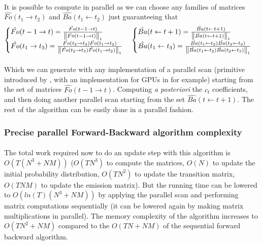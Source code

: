 \paragraph{}
It is possible to compute in parallel as we can choose any families of matrices $\hat{Fo}(t_1 \rightarrow t_2)$ and $\hat{Ba}(t_1 \leftarrow t_2)$ just guaranteeing that
\begin{equation}
\begin{cases}
\hat{Fo}( t - 1 \rightarrow t) = \frac{\bar{Fo}( t - 1 \rightarrow t)}{\left\lVert\bar{Fo}( t - 1 \rightarrow t)\right\rVert_1} & \\
\hat{Fo}( t_1 \rightarrow t_3) =   \frac{\hat{Fo}( t_2 \rightarrow t_3) \hat{Fo}( t_1 \rightarrow t_2)}{\left\lVert\hat{Fo}( t_2 \rightarrow t_3) \hat{Fo}( t_1 \rightarrow t_2)\right\rVert_1}& \\
\end{cases}
\begin{cases}
\hat{Ba}(t \leftarrow t+1) = \frac{\bar{Ba}(t \leftarrow t+1)}{\left\lVert\bar{Ba}(t \leftarrow t+1)\right\rVert_1} & \\
\hat{Ba}(t_1 \leftarrow t_3) = \frac{\hat{Ba}(t_1 \leftarrow t_2) \hat{Ba}(t_2 \leftarrow t_3)}{\left\lVert\hat{Ba}(t_1 \leftarrow t_2) \hat{Ba}(t_2 \leftarrow t_3)\right\rVert_1} & \\
\end{cases}
\end{equation}

\paragraph{}
Which we can generate with any implementation of a parallel scan (primitive introduced by \cite{blelloch1990prefix}, with an implementation for GPUs in \cite{sengupta2008efficient} for example) starting from the set of matrices $\hat{Fo}( t - 1 \rightarrow t)$. Computing \emph{a posteriori} the $c_t$ coefficients, and then doing another parallel scan starting from the set $\hat{Ba}(t \leftarrow t+1)$. The rest of the algorithm can be easily done in a parallel fashion.

\subsubsection*{Precise parallel Forward-Backward algorithm complexity}
\paragraph{}
The total work required now to do an update step with this algorithm is $O(T(N^3 + NM))$ ($O(TN^3)$ to compute the matrices, $O(N)$ to update the initial probability distribution, $O(TN^2)$ to update the transition matrix, $O(TNM)$ to update the emission matrix). But the running time can be lowered to $O(ln(T)(N^3 + NM))$ by applying the parallel scan and performing matrix computations sequentially (it can be lowered again by making matrix multiplications in parallel). The memory complexity of the algorithm increases to $O(TN^2 + NM)$ compared to the $O(TN + NM)$ of the sequential forward backward algorithm.

